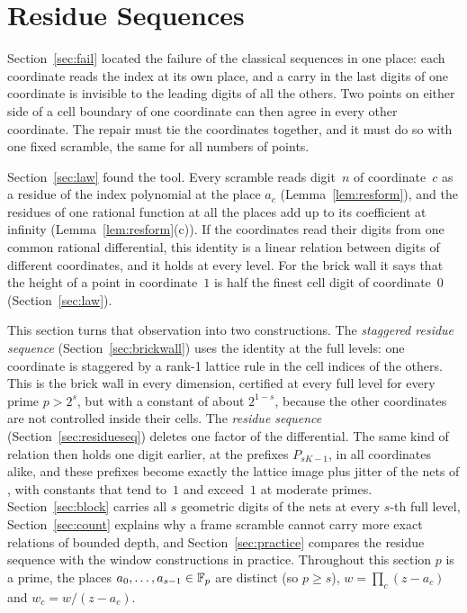 %
%
%
%
%
%
\section{Residue Sequences}\label{sec:residue}
Section~\ref{sec:fail} located the failure of the classical sequences in one place: each coordinate reads the index at its own place, and a carry in the last digits of one coordinate is invisible to the leading digits of all the others. Two points on either side of a cell boundary of one coordinate can then agree in every other coordinate. The repair must tie the coordinates together, and it must do so with one fixed scramble, the same for all numbers of points.

Section~\ref{sec:law} found the tool. Every scramble reads digit~$n$ of coordinate~$c$ as a residue of the index polynomial at the place $a_c$ (Lemma~\ref{lem:resform}), and the residues of one rational function at all the places add up to its coefficient at infinity (Lemma~\ref{lem:resform}(c)). If the coordinates read their digits from one common rational differential, this identity is a linear relation between digits of different coordinates, and it holds at every level. For the brick wall it says that the height of a point in coordinate~$1$ is half the finest cell digit of coordinate~$0$ (Section~\ref{sec:law}).

This section turns that observation into two constructions. The \emph{staggered residue sequence} (Section~\ref{sec:brickwall}) uses the identity at the full levels: one coordinate is staggered by a rank-1 lattice rule in the cell indices of the others. This is the brick wall in every dimension, certified at every full level for every prime $p>2^s$, but with a constant of about $2^{1-s}$, because the other coordinates are not controlled inside their cells. The \emph{residue sequence} (Section~\ref{sec:residueseq}) deletes one factor of the differential. The same kind of relation then holds one digit earlier, at the prefixes $P_{sK-1}$, in all coordinates alike, and these prefixes become exactly the lattice image plus jitter of the nets of \cite{Gru26geo}, with constants that tend to~$1$ and exceed~$1$ at moderate primes. Section~\ref{sec:block} carries all $s$ geometric digits of the nets at every $s$-th full level, Section~\ref{sec:count} explains why a frame scramble cannot carry more exact relations of bounded depth, and Section~\ref{sec:practice} compares the residue sequence with the window constructions in practice. Throughout this section $p$ is a prime, the places $a_0,\dots,a_{s-1}\in\mathbb{F}_p$ are distinct (so $p\ge s$), $w=\prod_c(z-a_c)$ and $w_c=w/(z-a_c)$.

